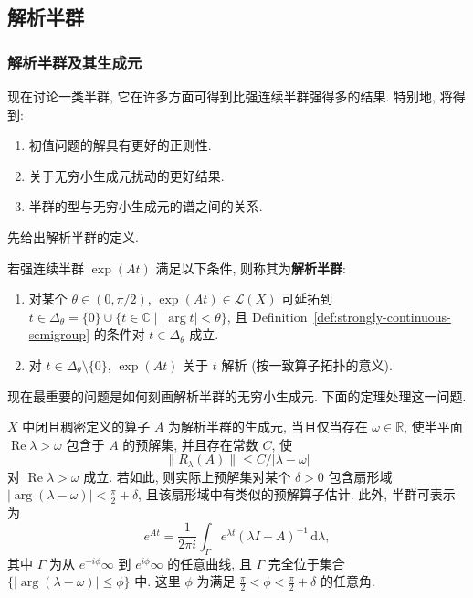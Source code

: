 \subsection{解析半群}\label{sec:analytic-semigroups}

\subsubsection{解析半群及其生成元}\label{subsec:analytic-semigroups-generators}

现在讨论一类半群, 它在许多方面可得到比强连续半群强得多的结果. 特别地, 将得到:\begin{enumerate}\item 初值问题的解具有更好的正则性.\item 关于无穷小生成元扰动的更好结果.\item 半群的型与无穷小生成元的谱之间的关系.\end{enumerate}先给出解析半群的定义.

\begin{Definition}
\label{def:analytic-semigroup}
若强连续半群 $\exp(At)$ 满足以下条件, 则称其为\textbf{解析半群}:\begin{enumerate}\item 对某个 $\theta\in(0,\pi/2)$, $\exp(At)\in\mathcal{L}(X)$ 可延拓到 $t\in\Delta_\theta=\{0\}\cup\{t\in\mathbb{C}\mid|\arg t|<\theta\}$, 且 Definition~\ref{def:strongly-continuous-semigroup} 的条件对 $t\in\Delta_\theta$ 成立.\item 对 $t\in\Delta_\theta\setminus\{0\}$, $\exp(At)$ 关于 $t$ 解析 (按一致算子拓扑的意义).\end{enumerate}
\end{Definition}

现在最重要的问题是如何刻画解析半群的无穷小生成元. 下面的定理处理这一问题.

\begin{Theorem}
\label{thm:analytic-generator-sectorial-resolvent}
$X$ 中闭且稠密定义的算子 $A$ 为解析半群的生成元, 当且仅当存在 $\omega\in\mathbb{R}$, 使半平面 $\operatorname{Re}\lambda>\omega$ 包含于 $A$ 的预解集, 并且存在常数 $C$, 使
\begin{equation}\label{eq:analytic-semigroup-half-plane-resolvent-estimate}
\|R_\lambda(A)\|\leq C/|\lambda-\omega|
\end{equation}
对 $\operatorname{Re}\lambda>\omega$ 成立. 若如此, 则实际上预解集对某个 $\delta>0$ 包含扇形域 $|\arg(\lambda-\omega)|<\frac{\pi}{2}+\delta$, 且该扇形域中有类似的预解算子估计. 此外, 半群可表示为
\begin{equation}\label{eq:analytic-semigroup-contour-integral-representation}
e^{At}=\dfrac{1}{2\pi i}\int_\Gamma e^{\lambda t}(\lambda I-A)^{-1}\,\mathrm{d}\lambda,
\end{equation}
其中 $\Gamma$ 为从 $e^{-i\phi}\infty$ 到 $e^{i\phi}\infty$ 的任意曲线, 且 $\Gamma$ 完全位于集合 $\{|\arg(\lambda-\omega)|\leq\phi\}$ 中. 这里 $\phi$ 为满足 $\frac{\pi}{2}<\phi<\frac{\pi}{2}+\delta$ 的任意角.
\end{Theorem}

